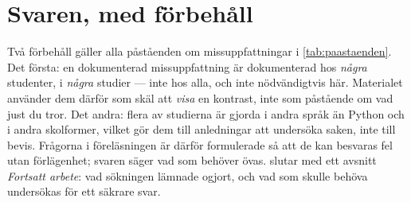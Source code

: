 \section{Svaren, med förbehåll}

Två förbehåll gäller alla påståenden om missuppfattningar i
\cref{tab:paastaenden}.  Det första: en dokumenterad missuppfattning är
dokumenterad hos \emph{några} studenter, i \emph{några} studier ---
inte hos alla, och inte nödvändigtvis här.  Materialet använder dem
därför som skäl att \emph{visa} en kontrast, inte som påstående om vad
just du tror.  Det andra: flera av studierna är gjorda i andra språk än
Python och i andra skolformer, vilket gör dem till anledningar att
undersöka saken, inte till bevis.  Frågorna i föreläsningen är därför
formulerade så att de kan besvaras fel utan förlägenhet; svaren säger
vad som behöver övas.   slutar med ett avsnitt
\emph{Fortsatt arbete}: vad sökningen lämnade ogjort, och vad som
skulle behöva undersökas för ett säkrare svar.

